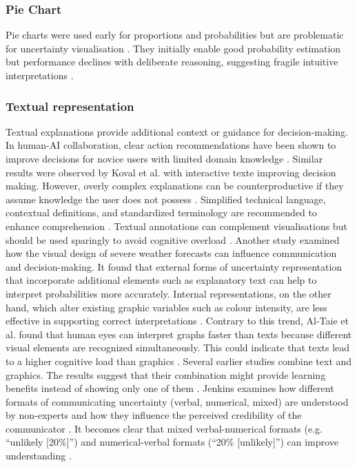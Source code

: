 \documentclass[final,journal,a4paper]{IEEEtran}
\begin{document}
\subsubsection{Pie Chart}
Pie charts were used early for proportions and probabilities but are problematic for uncertainty visualisation \cite{Ibrekk1987}. They initially enable good probability estimation but performance declines with deliberate reasoning, suggesting fragile intuitive interpretations \cite{Ibrekk1987}.

\subsubsection{Textual representation}
Textual explanations provide additional context or guidance for decision-making. In human-AI collaboration, clear action recommendations have been shown to improve decisions for novice users with limited domain knowledge \cite{Inkpen2023, Dong2024}. Similar results were observed by Koval et al. \cite{Koval2022} with interactive texte improving decision making. However, overly complex explanations can be counterproductive if they assume knowledge the user does not possess \cite{Krause2018}. Simplified technical language, contextual definitions, and standardized terminology are recommended to enhance comprehension \cite{Jit2025}. Textual annotations can complement visualisations but should be used sparingly to avoid cognitive overload \cite{Chen2025}. Another study examined how the visual design of severe weather forecasts can influence communication and decision-making. It found that external forms of uncertainty representation that incorporate additional elements such as explanatory text can help to interpret probabilities more accurately. Internal representations, on the other hand, which alter existing graphic variables such as colour intensity, are less effective in supporting correct interpretations \cite{Clive2023}. Contrary to this trend, Al-Taie et al. \cite{Al-Taie2014} found that human eyes can interpret graphs faster than texts because different visual elements are recognized simultaneously. This could indicate that texts lead to a higher cognitive load than graphics \cite{Al-Taie2014}.
\newline
Several earlier studies combine text and graphics. The results suggest that their combination might provide learning benefits instead of showing only one of them \cite{Bruny2008, Bruny2006}. Jenkins examines how different formats of communicating uncertainty (verbal, numerical, mixed) are understood by non-experts and how they influence the perceived credibility of the communicator \cite{Jenkins2020}. It becomes clear that mixed verbal-numerical formats (e.g. ``unlikely [20\%]'') and numerical-verbal formats (``20\% [unlikely]'') can improve understanding \cite{Jenkins2020}.
\end{document}
